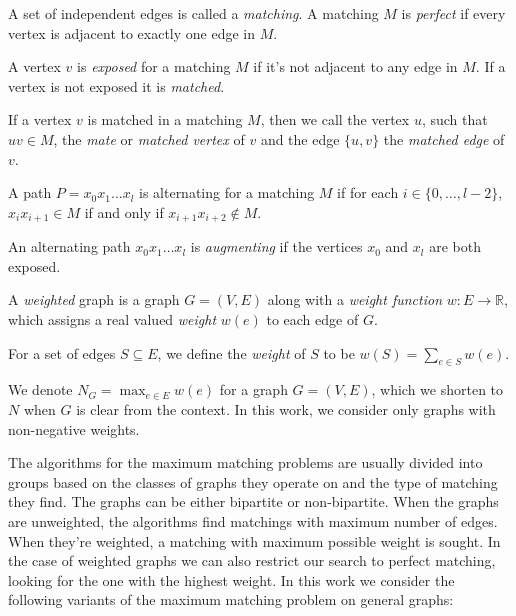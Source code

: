 \begin{defn}[matching]
    A set of independent edges is called a \emph{matching}. A matching $M$ is \emph{perfect} if every vertex is adjacent to exactly one edge in $M$.
\end{defn}

\begin{defn}
    A vertex $v$ is \emph{exposed} for a matching $M$ if it's not adjacent to any edge in $M$. If a vertex is not exposed it is \emph{matched}.
\end{defn}

If a vertex $v$ is matched in a matching $M$, then we call the vertex $u$, such that $uv \in M$, the \emph{mate} or \emph{matched vertex} of $v$ and the edge $\{u, v\}$ the \emph{matched edge} of $v$.

\begin{defn}
    A path $P = x_0x_1\dots x_l$ is alternating for a matching $M$ if for each $i \in \{0, \dots, l - 2\}$, $x_i x_{i+1} \in M$ if and only if $x_{i+1}x_{i+2} \notin M$.
\end{defn}

\begin{defn}
    An alternating path $x_0x_1\dots x_l$ is \emph{augmenting} if the vertices $x_0$ and $x_l$ are both exposed.
\end{defn}

\begin{defn}
    A \emph{weighted} graph is a graph $G = (V, E)$ along with a \emph{weight function} $w : E \rightarrow \mathbb{R}$, which assigns a real valued \emph{weight} $w(e)$ to each edge of $G$.
\end{defn}

For a set of edges $S \subseteq E$, we define the \emph{weight} of $S$ to be $w(S) = \sum_{e \in S} w(e)$. 

We denote $N_G = \max_{e \in E} w(e)$ for a graph $G = (V, E)$, which we shorten to $N$ when $G$ is clear from the context. In this work, we consider only graphs with non-negative weights.

The algorithms for the maximum matching problems are usually divided into groups based on the classes of graphs they operate on and the type of matching they find. The graphs can be either bipartite or non-bipartite. When the graphs are unweighted, the algorithms find matchings with maximum number of edges. When they're weighted, a matching with maximum possible weight is sought. In the case of weighted graphs we can also restrict our search to perfect matching, looking for the one with the highest weight. In this work we consider the following variants of the maximum matching problem on general graphs:

